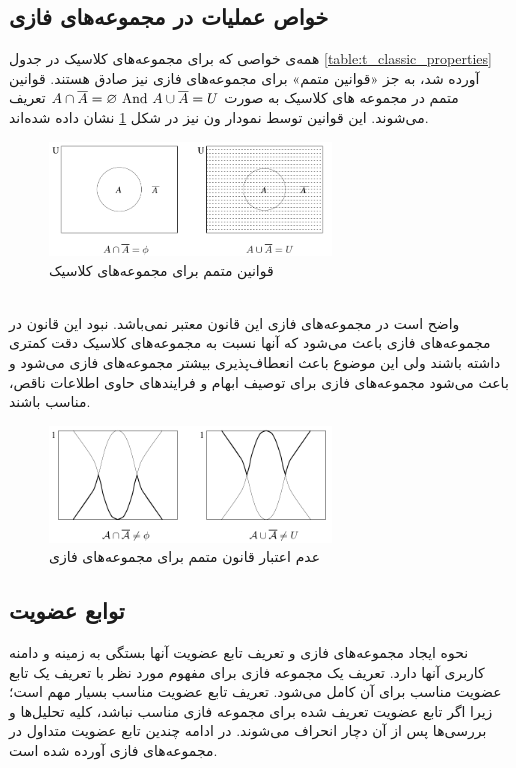  \subsection{‌خواص عملیات در مجموعه‌های فازی}
همه‌ی خواصی که برای مجموعه‌های کلاسیک در جدول 
\ref{table:t_classic_properties}
آورده شد، به جز «قوانین متمم» برای مجموعه‌های فازی نیز صادق هستند. 
قوانین متمم در مجموعه های کلاسیک به صورت 
$
A \cap \overline{A} = \varnothing {\rm \ And}\ A \cup \overline{A} = U $
تعریف می‌شوند. این قوانین توسط نمودار ون نیز در شکل 
\ref{fig:f_fset_excludedmiddle_classic}
نشان داده شده‌اند. 
\begin{figure}[!htbp]
	\centering 
	\includegraphics[width=75mm]{Images/Fig12.png}
	\vspace{-0.5cm}
	\caption{قوانین متمم برای مجموعه‌های کلاسیک} \label{fig:f_fset_excludedmiddle_classic}
\end{figure}\\
واضح است در مجموعه‌های فازی این قانون معتبر نمی‌باشد. نبود این قانون در مجموعه‌های فازی باعث می‌شود که آنها نسبت به مجموعه‌های کلاسیک دقت کمتری داشته باشند ولی این موضوع باعث انعطاف‌پذیری بیشتر مجموعه‌های فازی می‌شود و باعث می‌شود مجموعه‌های فازی برای توصیف ابهام و فرایندهای حاوی اطلاعات ناقص، مناسب باشند.
\begin{figure}[h]
	\centering 
	\includegraphics[width=75mm]{Images/Fig13.png}
	\vspace{-0.5cm}
	\caption{عدم اعتبار قانون متمم برای مجموعه‌های فازی} \label{fig:f_fset_excludedmiddle_fuzzy}
\end{figure}\cite{Bojadziev2007} 
 \subsection{‌توابع عضویت} 
 نحوه ایجاد مجموعه‌های فازی و تعریف تابع عضویت آنها بستگی به زمینه و دامنه کاربری آنها دارد. تعریف یک مجموعه فازی برای مفهوم مورد نظر با تعریف یک تابع عضویت مناسب برای آن کامل می‌شود. تعریف تابع عضویت مناسب بسیار مهم است؛ زیرا اگر تابع عضویت تعریف شده برای مجموعه فازی مناسب نباشد، کلیه تحلیل‌ها و بررسی‌ها پس از آن دچار انحراف می‌شوند. در ادامه چندین تابع عضویت متداول در مجموعه‌های فازی آورده شده است.
